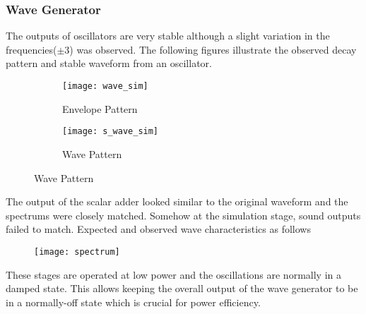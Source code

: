 \subsubsection*{Wave Generator}
The outputs of oscillators are very stable although a slight variation in the frequencies($\pm 3$) was observed. The following figures illustrate the observed decay pattern and stable waveform from an oscillator.
\begin{figure}[h]
    \begin{subfigure}{.48\columnwidth}
        \texttt{[image: wave\_sim]}
        \caption*{Envelope Pattern}
    \end{subfigure}
    \begin{subfigure}{.48\columnwidth}
        \texttt{[image: s\_wave\_sim]}
        \caption*{Wave Pattern}
    \end{subfigure}
\end{figure}

The output of the scalar adder looked similar to the original waveform and the spectrums were closely matched. Somehow at the simulation stage, sound outputs failed to match. Expected and observed wave characteristics as follows
\begin{figure}[h]
    \texttt{[image: spectrum]}
\end{figure}
These stages are operated at low power and the oscillations are normally in a damped state. This allows keeping the overall output of the wave generator to be in a normally-off state which is crucial for power efficiency.
